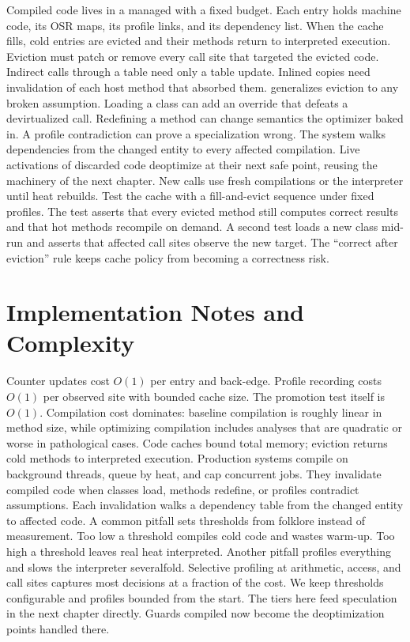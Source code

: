 Compiled code lives in a managed  with a fixed budget.
Each entry holds machine code, its OSR maps, its profile links, and its dependency list.
When the cache fills, cold entries are evicted and their methods return to interpreted execution.
Eviction must patch or remove every call site that targeted the evicted code.
Indirect calls through a table need only a table update.
Inlined copies need invalidation of each host method that absorbed them.
 generalizes eviction to any broken assumption.
Loading a class can add an override that defeats a devirtualized call.
Redefining a method can change semantics the optimizer baked in.
A profile contradiction can prove a specialization wrong.
The system walks dependencies from the changed entity to every affected compilation.
Live activations of discarded code deoptimize at their next safe point, reusing the machinery of the next chapter.
New calls use fresh compilations or the interpreter until heat rebuilds.
Test the cache with a fill-and-evict sequence under fixed profiles.
The test asserts that every evicted method still computes correct results and that hot methods recompile on demand.
A second test loads a new class mid-run and asserts that affected call sites observe the new target.
The \enquote{correct after eviction} rule keeps cache policy from becoming a correctness risk.

\section{Implementation Notes and Complexity}\label{sec:ch34-implementation}

Counter updates cost $O(1)$ per entry and back-edge.
Profile recording costs $O(1)$ per observed site with bounded cache size.
The promotion test itself is $O(1)$.
Compilation cost dominates: baseline compilation is roughly linear in method size, while optimizing compilation includes analyses that are quadratic or worse in pathological cases.
Code caches bound total memory; eviction returns cold methods to interpreted execution.
Production systems compile on background threads, queue by heat, and cap concurrent jobs.
They invalidate compiled code when classes load, methods redefine, or profiles contradict assumptions.
Each invalidation walks a dependency table from the changed entity to affected code.
A common pitfall sets thresholds from folklore instead of measurement.
Too low a threshold compiles cold code and wastes warm-up.
Too high a threshold leaves real heat interpreted.
Another pitfall profiles everything and slows the interpreter severalfold.
Selective profiling at arithmetic, access, and call sites captures most decisions at a fraction of the cost.
We keep thresholds configurable and profiles bounded from the start.
The tiers here feed speculation in the next chapter directly.
Guards compiled now become the deoptimization points handled there.

